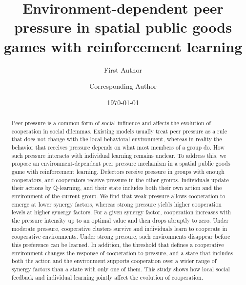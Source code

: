 \documentclass[%
  aip,cha,
  amsmath,amssymb,
  reprint,
  floatfix,
  article-title,
]{revtex4-2}
\begin{document}
\title[Environment-dependent peer pressure with reinforcement learning]{Environment-dependent peer pressure in spatial public goods games with reinforcement learning}

\author{First Author}
\author{Corresponding Author}

\date{\today}

\begin{abstract}
Peer pressure is a common form of social influence and affects the evolution of cooperation in social dilemmas. Existing models usually treat peer pressure as a rule that does not change with the local behavioral environment, whereas in reality the behavior that receives pressure depends on what most members of a group do. How such pressure interacts with individual learning remains unclear. To address this, we propose an environment-dependent peer pressure mechanism in a spatial public goods game with reinforcement learning. Defectors receive pressure in groups with enough cooperators, and cooperators receive pressure in the other groups. Individuals update their actions by Q-learning, and their state includes both their own action and the environment of the current group. We find that weak pressure allows cooperation to emerge at lower synergy factors, whereas strong pressure yields higher cooperation levels at higher synergy factors. For a given synergy factor, cooperation increases with the pressure intensity up to an optimal value and then drops abruptly to zero. Under moderate pressure, cooperative clusters survive and individuals learn to cooperate in cooperative environments. Under strong pressure, such environments disappear before this preference can be learned. In addition, the threshold that defines a cooperative environment changes the response of cooperation to pressure, and a state that includes both the action and the environment supports cooperation over a wider range of synergy factors than a state with only one of them. This study shows how local social feedback and individual learning jointly affect the evolution of cooperation.
\end{abstract}

\maketitle
\end{document}
